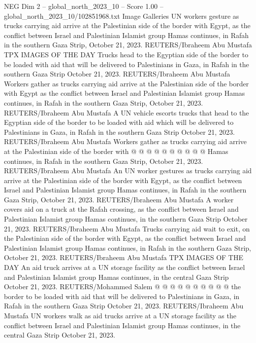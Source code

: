 \begin{textsample}{NEG Dim 2 – global\_north\_2023\_10 – Score 1.00 – global\_north\_2023\_10/102851968.txt}  \label{ex:f2_neg_300}
Image Galleries UN workers gesture as trucks carrying aid arrive at the Palestinian side of the border with Egypt, as the conflict between Israel and Palestinian Islamist group Hamas continues, in Rafah in the southern Gaza Strip, October 21, 2023.
REUTERS/Ibraheem Abu Mustafa TPX IMAGES OF THE DAY Trucks head to the Egyptian side of the border to be loaded with aid that will be delivered to Palestinians in Gaza, in Rafah in the southern Gaza Strip October 21, 2023.
REUTERS/Ibraheem Abu Mustafa Workers gather as trucks carrying aid arrive at the Palestinian side of the border with Egypt as the conflict between Israel and Palestinian Islamist group Hamas continues, in Rafah in the southern Gaza Strip, October 21, 2023.
REUTERS/Ibraheem Abu Mustafa A UN vehicle escorts trucks that head to the Egyptian side of the border to be loaded with aid which will be delivered to Palestinians in Gaza, in Rafah in the southern Gaza Strip October 21, 2023.
REUTERS/Ibraheem Abu Mustafa Workers gather as trucks carrying aid arrive at the Palestinian side of the border with @ @ @ @ @ @ @ @ @ @ Hamas continues, in Rafah in the southern Gaza Strip, October 21, 2023.
REUTERS/Ibraheem Abu Mustafa An UN worker gestures as trucks carrying aid arrive at the Palestinian side of the border with Egypt, as the conflict between Israel and Palestinian Islamist group Hamas continues, in Rafah in the southern Gaza Strip, October 21, 2023.
REUTERS/Ibraheem Abu Mustafa A worker covers aid on a truck at the Rafah crossing, as the conflict between Israel and Palestinian Islamist group Hamas continues, in the southern Gaza Strip October 21, 2023.
REUTERS/Ibraheem Abu Mustafa Trucks carrying aid wait to exit, on the Palestinian side of the border with Egypt, as the conflict between Israel and Palestinian Islamist group Hamas continues, in Rafah in the southern Gaza Strip, October 21, 2023.
REUTERS/Ibraheem Abu Mustafa TPX IMAGES OF THE DAY An aid truck arrives at a UN storage facility as the conflict between Israel and Palestinian Islamist group Hamas continues, in the central Gaza Strip October 21, 2023.
REUTERS/Mohammed Salem @ @ @ @ @ @ @ @ @ @ the border to be loaded with aid that will be delivered to Palestinians in Gaza, in Rafah in the southern Gaza Strip October 21, 2023.
REUTERS/Ibraheem Abu Mustafa UN workers walk as aid trucks arrive at a UN storage facility as the conflict between Israel and Palestinian Islamist group Hamas continues, in the central Gaza Strip October 21, 2023.

\end{textsample}

